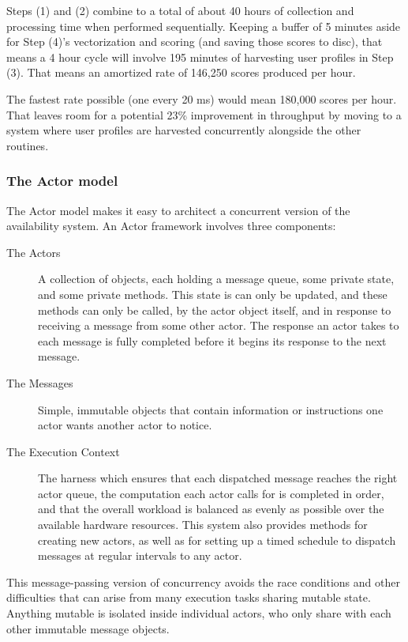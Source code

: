 \documentclass{article}
\begin{document}
 Steps (1) and (2) combine to a total of about 40 hours of collection and
processing time when performed sequentially. Keeping a buffer of 5 minutes aside
for Step (4)'s vectorization and scoring (and saving those scores to disc), that
means a 4 hour cycle will involve 195 minutes of harvesting user profiles in
Step (3). That means an amortized rate of 146,250 scores produced per hour. 

The fastest rate possible (one every 20 ms) would mean 180,000 scores per
hour. That leaves room for a potential 23\% improvement in throughput
by moving to a system where user profiles are harvested concurrently
alongside the other routines.

\subsubsection{The Actor model}

The Actor model makes it easy to architect a concurrent version of the
availability system. An Actor framework involves three components:

\begin{description}
\item[The Actors] A collection of objects, each holding a message queue, some 
private state, and some private methods. This state is can only be updated, and
these methods can only be called, by the actor object itself, and in response to 
receiving a message from some other actor. The response an actor takes to each
message is fully completed before it begins its response to the next message.
\item[The Messages] Simple, immutable objects that contain information or 
instructions one actor wants another actor to notice. 
\item[The Execution Context] The harness which ensures that each dispatched 
message reaches the right actor queue, the computation each actor calls for is
completed in order, and that the overall workload is balanced as evenly as possible
over the available hardware resources. This system also provides methods for
creating new actors, as well as for setting up a timed schedule to dispatch
messages at regular intervals to any actor.
\end{description}

This message-passing version of concurrency avoids the race conditions and
other difficulties that can arise from many execution tasks sharing mutable state.
Anything mutable is isolated inside individual actors, who only share with each
other immutable message objects.
\end{document}
